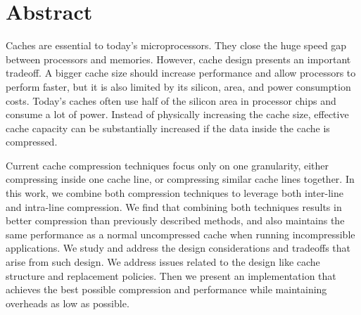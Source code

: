 
\chapter{Abstract}
Caches are essential to today's microprocessors. They close the huge speed gap between processors and memories. However, cache design presents an important tradeoff. A bigger cache size should increase performance and allow processors to perform faster, but it is also limited by its silicon, area, and power consumption costs. Today's caches often use half of the silicon area in processor chips and consume a lot of power. Instead of physically increasing the cache size, effective cache capacity can be substantially increased if the data inside the cache is compressed.\par
Current cache compression techniques focus only on one granularity, either compressing inside one cache line, or compressing similar cache lines together. In this work, we combine both compression techniques to leverage both inter-line and intra-line compression. We find that combining both techniques results in better compression than previously described methods, and also maintains the same performance as a normal uncompressed cache when running incompressible applications. We study and address the design considerations and tradeoffs that arise from such design. We address issues related to the design like cache structure and replacement policies. Then we present an implementation that achieves the best possible compression and performance while maintaining overheads as low as possible.

